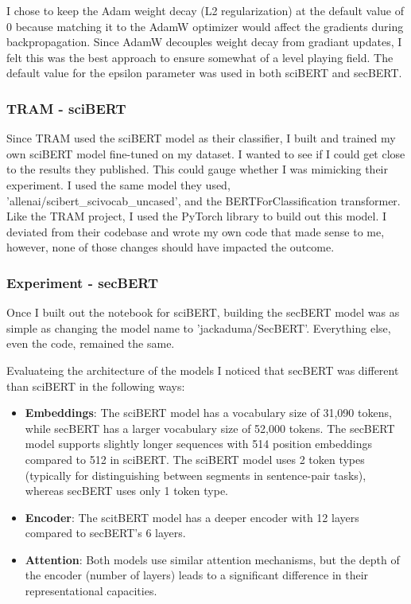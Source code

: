 \documentclass[11pt]{article}
\begin{document}
I chose to keep the Adam weight decay (L2 regularization) at the default value of 0 because matching it to the AdamW optimizer would affect the gradients during backpropagation. Since AdamW decouples weight decay from gradiant updates, I felt this was the best approach to ensure somewhat of a level playing field. The default value for the epsilon parameter was used in both sciBERT and secBERT.  

\subsubsection{TRAM - sciBERT}

Since TRAM used the sciBERT model as their classifier, I built and trained my own sciBERT model fine-tuned on my dataset. I wanted to see if I could get close to the results they published. This could gauge whether I was mimicking their experiment. I used the same model they used, 'allenai/scibert\_scivocab\_uncased', and the BERTForClassification transformer. Like the TRAM project, I used the PyTorch library to build out this model. I deviated from their codebase and wrote my own code that made sense to me, however, none of those changes should have impacted the outcome. 

\subsubsection{Experiment - secBERT}

Once I built out the notebook for sciBERT, building the secBERT model was as simple as changing the model name to 'jackaduma/SecBERT'. Everything else, even the code, remained the same. 

Evaluateing the architecture of the models I noticed that secBERT was different than sciBERT in the following ways:

\begin{itemize}
	\item \textbf{Embeddings}: The sciBERT model has a vocabulary size of 31,090 tokens, while secBERT has a larger vocabulary size of 52,000 tokens. The secBERT model supports slightly longer sequences with 514 position embeddings compared to 512 in sciBERT. The sciBERT model uses 2 token types (typically for distinguishing between segments in sentence-pair tasks), whereas secBERT uses only 1 token type.
	\item \textbf{Encoder}: The scitBERT model has a deeper encoder with 12 layers compared to secBERT's 6 layers.
        \item \textbf{Attention}: Both models use similar attention mechanisms, but the depth of the encoder (number of layers) leads to a significant difference in their representational capacities.
\end{itemize}
\end{document}
